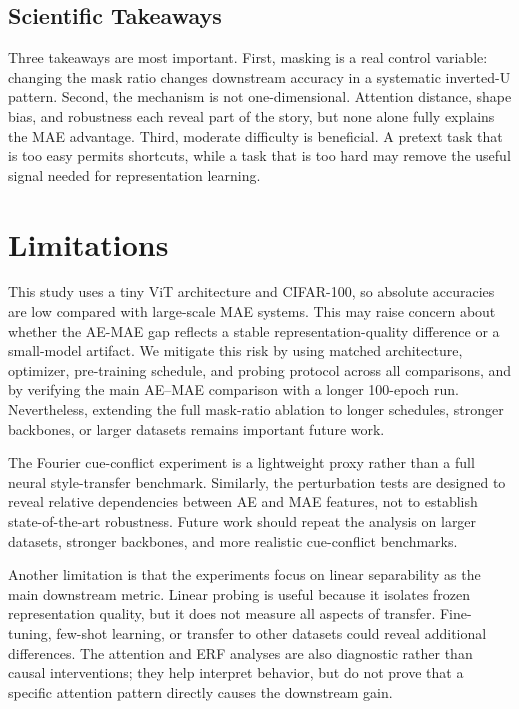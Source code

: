 \documentclass[10pt,twocolumn,letterpaper]{article}
\begin{document}
\subsection{Scientific Takeaways}

Three takeaways are most important. First, masking is a real control variable: changing the mask ratio changes downstream accuracy in a systematic inverted-U pattern. Second, the mechanism is not one-dimensional. Attention distance, shape bias, and robustness each reveal part of the story, but none alone fully explains the MAE advantage. Third, moderate difficulty is beneficial. A pretext task that is too easy permits shortcuts, while a task that is too hard may remove the useful signal needed for representation learning.

\section{Limitations}

This study uses a tiny ViT architecture and CIFAR-100, so absolute accuracies are low compared with large-scale MAE systems. This may raise concern about whether the AE-MAE gap reflects a stable representation-quality difference or a small-model artifact. We mitigate this risk by using matched architecture, optimizer, pre-training schedule, and probing protocol across all comparisons, and by verifying the main AE--MAE comparison with a longer 100-epoch run. Nevertheless, extending the full mask-ratio ablation to longer schedules, stronger backbones, or larger datasets remains important future work.

The Fourier cue-conflict experiment is a lightweight proxy rather than a full neural style-transfer benchmark. Similarly, the perturbation tests are designed to reveal relative dependencies between AE and MAE features, not to establish state-of-the-art robustness. Future work should repeat the analysis on larger datasets, stronger backbones, and more realistic cue-conflict benchmarks.

Another limitation is that the experiments focus on linear separability as the main downstream metric. Linear probing is useful because it isolates frozen representation quality, but it does not measure all aspects of transfer. Fine-tuning, few-shot learning, or transfer to other datasets could reveal additional differences. The attention and ERF analyses are also diagnostic rather than causal interventions; they help interpret behavior, but do not prove that a specific attention pattern directly causes the downstream gain.
\end{document}
